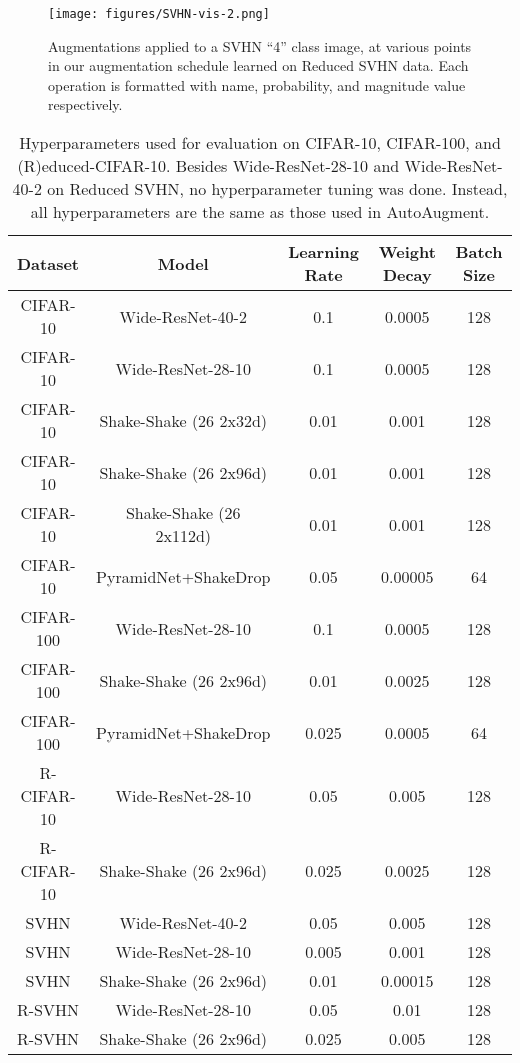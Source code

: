 \documentclass{article}
\begin{document}
\begin{figure}[t]
  \centering
  \texttt{[image: figures/SVHN-vis-2.png]}
  \caption{Augmentations applied to a SVHN ``4'' class image, at various points in our augmentation schedule learned on Reduced SVHN data. Each operation is formatted with name, probability, and magnitude value respectively.} \label{fig:svhn-viz}
\end{figure}

\begin{table*}[t]
\caption{Hyperparameters used for evaluation on CIFAR-10, CIFAR-100, and (R)educed-CIFAR-10. Besides Wide-ResNet-28-10 and Wide-ResNet-40-2 on Reduced SVHN, no hyperparameter tuning was done. Instead, all hyperparameters are the same as those used in AutoAugment.}
\label{table-hp-cifar10}
\vskip 0.15in
\begin{center}
\begin{small}
\begin{tabular}{ccccc}
\toprule
Dataset & Model & Learning Rate & Weight Decay & Batch Size \\
\midrule
CIFAR-10 & Wide-ResNet-40-2    &   0.1 & 0.0005 & 128 \\
CIFAR-10 & Wide-ResNet-28-10    &   0.1 & 0.0005 & 128 \\
CIFAR-10 & Shake-Shake (26 2x32d) & 0.01 & 0.001 & 128 \\
CIFAR-10 & Shake-Shake (26 2x96d) & 0.01 & 0.001 & 128 \\
CIFAR-10 & Shake-Shake (26 2x112d) & 0.01 & 0.001 & 128 \\
CIFAR-10 & PyramidNet+ShakeDrop   & 0.05 & 0.00005 & 64 \\
CIFAR-100 & Wide-ResNet-28-10    &   0.1 & 0.0005 & 128 \\
CIFAR-100 & Shake-Shake (26 2x96d) & 0.01 & 0.0025 & 128 \\
CIFAR-100 & PyramidNet+ShakeDrop   & 0.025 & 0.0005 & 64 \\
R-CIFAR-10 & Wide-ResNet-28-10    &   0.05 & 0.005 & 128 \\
R-CIFAR-10 & Shake-Shake (26 2x96d) & 0.025 & 0.0025 & 128 \\
SVHN & Wide-ResNet-40-2    &   0.05 & 0.005 & 128 \\
SVHN & Wide-ResNet-28-10 & 0.005 & 0.001 & 128 \\
SVHN & Shake-Shake (26 2x96d) & 0.01 & 0.00015 & 128 \\
R-SVHN & Wide-ResNet-28-10 & 0.05 & 0.01 & 128 \\
R-SVHN & Shake-Shake (26 2x96d) & 0.025 & 0.005 & 128 \\
\bottomrule
\end{tabular}
\end{small}
\end{center}
\vskip -0.1in
\end{table*} 
\end{document}
